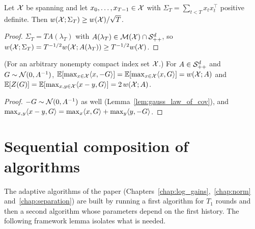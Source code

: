 \begin{lemma}\label{lem:width_empirical}
\leanok
{}
Let $\mathcal{X}$ be spanning and let $x_0,\dots,x_{T-1} \in \mathcal{X}$ with $\Sigma_T = \sum_{t<T} x_tx_t^\top$ positive definite.
Then $w(\mathcal{X};\Sigma_T) \ge w(\mathcal{X})/\sqrt T$.
\end{lemma}

\begin{proof}
\leanok
{}
$\Sigma_T = T A(\lambda_T)$ with $A(\lambda_T) \in \mathcal{M}(\mathcal{X})\cap\mathcal{S}_{++}^{d}$, so
$w(\mathcal{X};\Sigma_T) = T^{-1/2}w(\mathcal{X};A(\lambda_T)) \ge T^{-1/2}w(\mathcal{X})$.
\end{proof}

\begin{lemma}\label{lem:width_symm}
\leanok
{}
(For an arbitrary nonempty compact index set $\mathcal{X}$.) For $A \in \mathcal{S}_{++}^{d}$ and $G \sim \mathcal{N}(0,A^{-1})$,
$\mathbb{E}[\max_{x\in\mathcal{X}}\langle x, -G \rangle] = \mathbb{E}[\max_{x\in\mathcal{X}}\langle x, G \rangle] = w(\mathcal{X};A)$ and
$\mathbb{E}[Z(G)] = \mathbb{E}[\max_{x,y\in\mathcal{X}}\langle x-y, G \rangle] = 2\,w(\mathcal{X};A)$.
\end{lemma}

\begin{proof}
\leanok
{}
$-G \sim \mathcal{N}(0,A^{-1})$ as well (Lemma~\ref{lem:gauss_law_of_cov}), and
$\max_{x,y}\langle x-y, G \rangle = \max_x\langle x, G \rangle + \max_y\langle y, -G \rangle$.
\end{proof}

\section{Sequential composition of algorithms}
\label{sec:model_composition}

The adaptive algorithms of the paper (Chapters~\ref{chap:log_gains},~\ref{chap:norm}
and~\ref{chap:separation}) are built by running a first algorithm for $T_1$ rounds and then
a second algorithm whose parameters depend on the first history. The following framework
lemma isolates what is needed.

